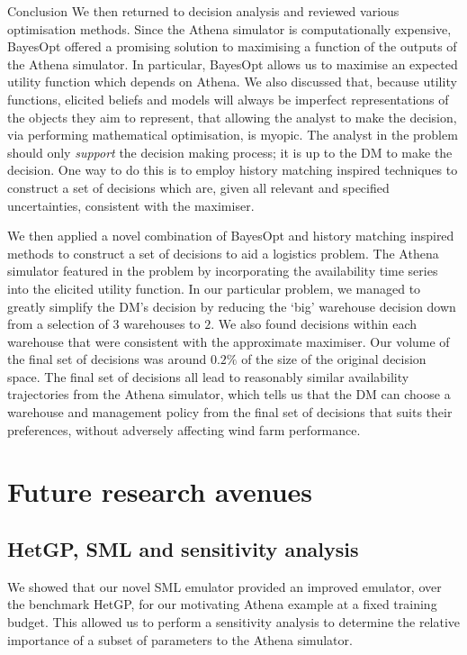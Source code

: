 \begin{chapter}{Conclusion \label{Ch:conclusions}}
We then returned to decision analysis and reviewed various optimisation methods. Since the Athena simulator is computationally expensive, BayesOpt offered a promising solution to maximising a function of the outputs of the Athena simulator. In particular, BayesOpt allows us to maximise an expected utility function which depends on Athena. We also discussed that, because utility functions, elicited beliefs and models will always be imperfect representations of the objects they aim to represent, that allowing the analyst to make the decision, via performing mathematical optimisation, is myopic. The analyst in the problem should only \textit{support} the decision making process; it is up to the DM to make the decision. One way to do this is to employ history matching inspired techniques to construct a set of decisions which are, given all relevant and specified uncertainties, consistent with the maximiser. %

We then applied a novel combination of BayesOpt and history matching inspired methods to construct a set of decisions to aid a logistics problem. The Athena simulator featured in the problem by incorporating the availability time series into the elicited utility function. In our particular problem, we managed to greatly simplify the DM's decision by reducing the `big' warehouse decision down from a selection of $3$ warehouses to $2$. We also found decisions within each warehouse that were consistent with the approximate maximiser. Our volume of the final set of decisions was around $0.2\%$ of the size of the original decision space. The final set of decisions all lead to reasonably similar availability trajectories from the Athena simulator, which tells us that the DM can choose a warehouse and management policy from the final set of decisions that suits their preferences, without adversely affecting wind farm performance.

\section{Future research avenues}
\subsection{HetGP, SML and sensitivity analysis}
We showed that our novel SML emulator provided an improved emulator, over the benchmark HetGP, for our motivating Athena example at a fixed training budget. This allowed us to perform a sensitivity analysis to determine the relative importance of a subset of parameters to the Athena simulator.


\end{chapter}
